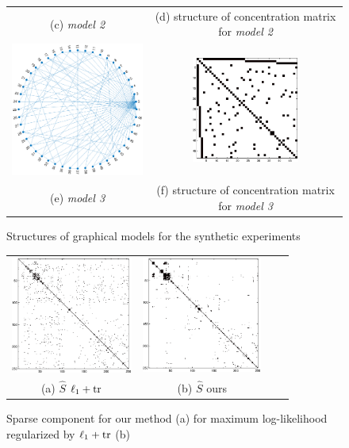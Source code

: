 \documentclass{article}
\begin{document}
\begin{figure}
\begin{tabular}{cc}
   \\    (c) \textit{model 2} & (d)  structure of concentration matrix for \textit{model 2} \\
      \includegraphics[width=6cm]{fig/diff_graph} 
  &   \includegraphics[width=3.5cm]{fig/diff_true}
   \\    (e) \textit{model 3} & (f)  structure of concentration matrix for \textit{model 3}
\end{tabular}
\caption{ Structures of graphical models for the synthetic experiments}
\end{figure}

\begin{figure}
\center
\begin{tabular}{cccc}
      \includegraphics[width=4cm]{fig/MILE_Som}
  &   \includegraphics[height=3.8cm]{fig/MILE_Ssl_ordered}
   \\   (a)  $\hat{S}$ $\ell_1+{\rm tr}$  & (b) $\hat{S}$ ours 
\end{tabular}
\caption{Sparse component for our method (a) for maximum log-likelihood regularized by $\ell_1+{\rm tr}$ (b) }
\end{figure}
\end{document}
